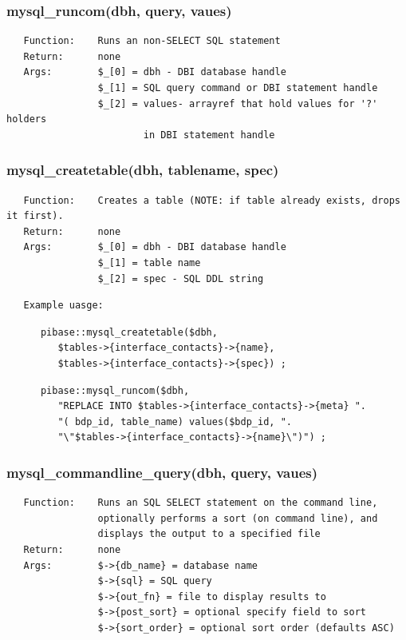 \documentclass{article}
\begin{document}
\subsubsection*{mysql\_runcom(dbh, query, vaues)\label{pibase_pm_mysql_runcom_dbh_query_vaues_}}
\begin{verbatim}
   Function:    Runs an non-SELECT SQL statement
   Return:      none
   Args:        $_[0] = dbh - DBI database handle
                $_[1] = SQL query command or DBI statement handle
                $_[2] = values- arrayref that hold values for '?' holders
                        in DBI statement handle
\end{verbatim}
\subsubsection*{mysql\_createtable(dbh, tablename, spec)\label{pibase_pm_mysql_createtable_dbh_tablename_spec_}}
\begin{verbatim}
   Function:    Creates a table (NOTE: if table already exists, drops it first).
   Return:      none
   Args:        $_[0] = dbh - DBI database handle
                $_[1] = table name
                $_[2] = spec - SQL DDL string
\end{verbatim}
\begin{verbatim}
   Example uasge:
\end{verbatim}
\begin{verbatim}
      pibase::mysql_createtable($dbh,
         $tables->{interface_contacts}->{name},
         $tables->{interface_contacts}->{spec}) ;
\end{verbatim}
\begin{verbatim}
      pibase::mysql_runcom($dbh,
         "REPLACE INTO $tables->{interface_contacts}->{meta} ".
         "( bdp_id, table_name) values($bdp_id, ".
         "\"$tables->{interface_contacts}->{name}\")") ;
\end{verbatim}
\subsubsection*{mysql\_commandline\_query(dbh, query, vaues)\label{pibase_pm_mysql_commandline_query_dbh_query_vaues_}}
\begin{verbatim}
   Function:    Runs an SQL SELECT statement on the command line,
                optionally performs a sort (on command line), and 
                displays the output to a specified file
   Return:      none
   Args:        $->{db_name} = database name
                $->{sql} = SQL query
                $->{out_fn} = file to display results to
                $->{post_sort} = optional specify field to sort
                $->{sort_order} = optional sort order (defaults ASC)
\end{verbatim}
\end{document}
